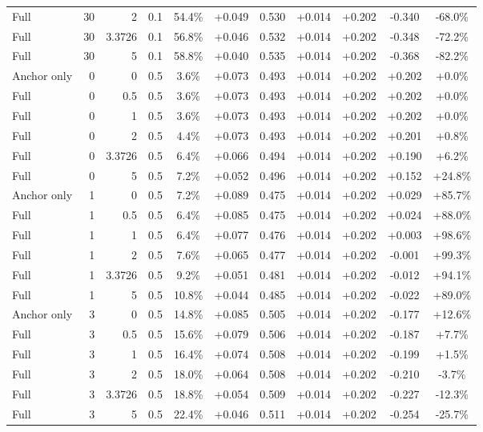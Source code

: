 \begin{table}[htbp]
\begin{tabular}{lrrrccccccc}
Full & 30 & 2 & 0.1 & 54.4\% & +0.049 & 0.530 & +0.014 & +0.202 & -0.340 & -68.0\% \\
Full & 30 & 3.3726 & 0.1 & 56.8\% & +0.046 & 0.532 & +0.014 & +0.202 & -0.348 & -72.2\% \\
Full & 30 & 5 & 0.1 & 58.8\% & +0.040 & 0.535 & +0.014 & +0.202 & -0.368 & -82.2\% \\
Anchor only & 0 & 0 & 0.5 & 3.6\% & +0.073 & 0.493 & +0.014 & +0.202 & +0.202 & +0.0\% \\
Full & 0 & 0.5 & 0.5 & 3.6\% & +0.073 & 0.493 & +0.014 & +0.202 & +0.202 & +0.0\% \\
Full & 0 & 1 & 0.5 & 3.6\% & +0.073 & 0.493 & +0.014 & +0.202 & +0.202 & +0.0\% \\
Full & 0 & 2 & 0.5 & 4.4\% & +0.073 & 0.493 & +0.014 & +0.202 & +0.201 & +0.8\% \\
Full & 0 & 3.3726 & 0.5 & 6.4\% & +0.066 & 0.494 & +0.014 & +0.202 & +0.190 & +6.2\% \\
Full & 0 & 5 & 0.5 & 7.2\% & +0.052 & 0.496 & +0.014 & +0.202 & +0.152 & +24.8\% \\
Anchor only & 1 & 0 & 0.5 & 7.2\% & +0.089 & 0.475 & +0.014 & +0.202 & +0.029 & +85.7\% \\
Full & 1 & 0.5 & 0.5 & 6.4\% & +0.085 & 0.475 & +0.014 & +0.202 & +0.024 & +88.0\% \\
Full & 1 & 1 & 0.5 & 6.4\% & +0.077 & 0.476 & +0.014 & +0.202 & +0.003 & +98.6\% \\
Full & 1 & 2 & 0.5 & 7.6\% & +0.065 & 0.477 & +0.014 & +0.202 & -0.001 & +99.3\% \\
Full & 1 & 3.3726 & 0.5 & 9.2\% & +0.051 & 0.481 & +0.014 & +0.202 & -0.012 & +94.1\% \\
Full & 1 & 5 & 0.5 & 10.8\% & +0.044 & 0.485 & +0.014 & +0.202 & -0.022 & +89.0\% \\
Anchor only & 3 & 0 & 0.5 & 14.8\% & +0.085 & 0.505 & +0.014 & +0.202 & -0.177 & +12.6\% \\
Full & 3 & 0.5 & 0.5 & 15.6\% & +0.079 & 0.506 & +0.014 & +0.202 & -0.187 & +7.7\% \\
Full & 3 & 1 & 0.5 & 16.4\% & +0.074 & 0.508 & +0.014 & +0.202 & -0.199 & +1.5\% \\
Full & 3 & 2 & 0.5 & 18.0\% & +0.064 & 0.508 & +0.014 & +0.202 & -0.210 & -3.7\% \\
Full & 3 & 3.3726 & 0.5 & 18.8\% & +0.054 & 0.509 & +0.014 & +0.202 & -0.227 & -12.3\% \\
Full & 3 & 5 & 0.5 & 22.4\% & +0.046 & 0.511 & +0.014 & +0.202 & -0.254 & -25.7\% \\

\end{tabular}
\end{table}
